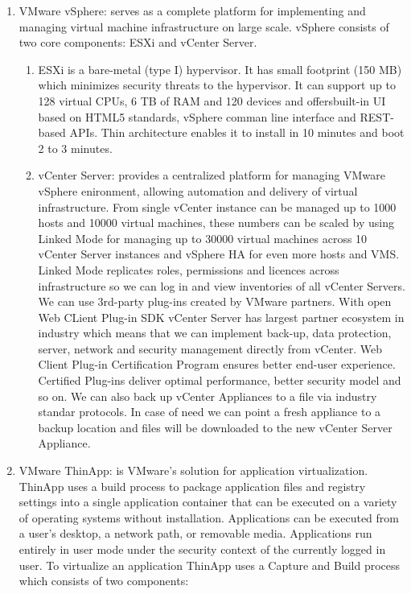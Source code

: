\begin{itemize}
\begin{enumerate}
\item VMware vSphere: serves as a complete platform for implementing and managing virtual machine infrastructure on large scale. vSphere consists of two core components: ESXi and vCenter Server.
\begin{enumerate}
\item ESXi is a bare-metal (type I) hypervisor. It has small footprint (150 MB) which minimizes security threats to the hypervisor. It can support up to 128 virtual CPUs, 6 TB of RAM and 120 devices and offersbuilt-in UI based on HTML5 standards, vSphere comman line interface and REST-based APIs. Thin architecture enables it to install in 10 minutes and boot 2 to 3 minutes.
\item vCenter Server: provides a centralized platform for managing VMware vSphere enironment, allowing automation and delivery of virtual infrastructure. From single vCenter instance can be managed up to 1000 hosts and 10000 virtual machines, these numbers can be scaled by using Linked Mode for managing up to 30000 virtual machines across 10 vCenter Server instances and vSphere HA for even more hosts and VMS. Linked Mode replicates roles, permissions and licences across infrastructure so we can log in and view inventories of all vCenter Servers. We can use 3rd-party plug-ins created by VMware partners. With open Web CLient Plug-in SDK vCenter Server has largest partner ecosystem in industry which means that we can implement back-up, data protection, server, network and security management directly from vCenter. Web Client Plug-in Certification Program ensures better end-user experience. Certified Plug-ins deliver optimal performance, better security model and so on. We can also back up vCenter Appliances to a file via industry standar protocols. In case of need we can point a fresh appliance to a backup location and files will be downloaded to the new vCenter Server Appliance.
\end{enumerate}
\item VMware ThinApp: is VMware's solution for application virtualization. ThinApp uses a build process to package application files and registry settings into a single application container that can be executed on a variety of operating systems without installation. Applications can be executed from a user’s desktop, a network path, or removable media. Applications run entirely in user mode under the security context of the currently logged in user. To virtualize an application ThinApp uses a Capture and Build process which consists of two components:

\end{enumerate}
\end{itemize}
